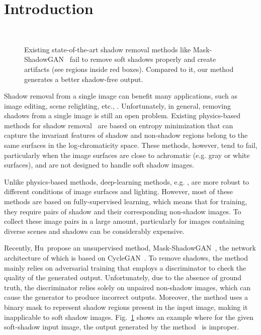 \documentclass[10pt,twocolumn,letterpaper]{article}
\begin{document}
\section{Introduction}
\label{sec:intr}
\begin{figure}[t]
	\centering
\captionsetup[subfloat]{farskip=2pt}
	\hfill
	\hfill\\
	\hfill
	\hfill
	\caption{Existing state-of-the-art shadow removal methods like Mask-ShadowGAN~\cite{Hu19} fail to remove soft shadows properly and create artifacts (see regions inside red boxes). Compared to it, our method generates a better shadow-free output.}
	\vspace{-0.15in}
	\label{fig:intro}
\end{figure}

Shadow removal from a single image can benefit many applications, such as image editing, scene relighting, etc., \cite{Lalonde09,Khan15,Kawakami05}. 
Unfortunately, in general, removing shadows from a single image is still an open problem.
Existing physics-based methods for shadow removal~\cite{Finlayson05,Finlayson09,Guo11} are based on entropy minimization that can capture the invariant features of shadow and non-shadow regions belong to the same surfaces in the log-chromaticity space.  
These methods, however, tend to fail, particularly when the image surfaces are close to achromatic (e.g. gray or white surfaces), and are not designed to handle soft shadow images.


Unlike physics-based methods, deep-learning methods, e.g.  \cite{Qu17,Wang18,Hu18,Le19,Cun20,le2020shadow}, are more robust to different conditions of image surfaces and lighting.
However, most of these methods are based on fully-supervised learning, which means that for training, they require pairs of shadow and their corresponding non-shadow images. To collect these image pairs in a large amount, particularly for images containing diverse scenes and shadows can be considerably expensive.

Recently, Hu~\etal propose an unsupervised method, Mask-ShadowGAN~\cite{Hu19}, the network architecture of which is based on CycleGAN~\cite{Zhu17}. To remove shadows, the method mainly relies on adversarial training that employs a discriminator to check the quality of the generated output. Unfortunately, due to the absence of ground truth, the discriminator relies solely on unpaired non-shadow images, which can cause the generator to produce incorrect outputs. 
Moreover, the method uses a binary mask to represent shadow regions present in the input image, making it inapplicable to soft shadow images. Fig.~\ref{fig:intro} shows an example where for the given soft-shadow input image, the output generated by the method~\cite{Hu19} is improper.
\end{document}

